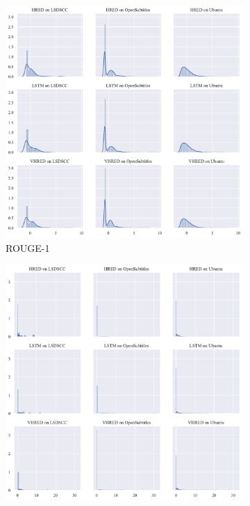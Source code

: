 \begin{figure}[H]
    \centering
    \begin{subfigure}{0.5\linewidth}
        \centering
        \includegraphics[width=\linewidth]{figure/distplot_grid/rouge_1/plot.pdf}
        \caption{ROUGE-1}
    \end{subfigure}%
    \begin{subfigure}{0.5\linewidth}
        \centering
        \includegraphics[width=\linewidth]{figure/distplot_grid/rouge_2/plot.pdf}

\end{subfigure}
\end{figure}
